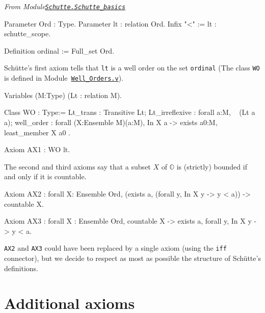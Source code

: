 \documentclass[a4paper]{book}
\begin{document}
\vspace{6pt}

\emph{From Module\href{../src/html/hydras.Schutte.Schutte_basics.html}%
{\texttt{Schutte.Schutte\_basics}}}

\begin{Coqsrc}
Parameter Ord : Type.
Parameter lt : relation Ord.
Infix "<" := lt : schutte_scope.

Definition ordinal := Full_set Ord.
\end{Coqsrc}

Schütte's first axiom tells that \texttt{lt} is a well order on the set 
\texttt{ordinal} (The  class \texttt{WO} is defined in
Module~\href{../src/html/hydras.Schutte.Well_Orders.html}%
{\texttt{Well\_Orders.v}}).

\label{types:WO}

\begin{Coqsrc}
Variables (M:Type)
         (Lt : relation M).
  
Class WO : Type:=
    {
      Lt_trans : Transitive  Lt;
      Lt_irreflexive : forall a:M, ~ (Lt a a);
      well_order : forall (X:Ensemble M)(a:M),
          In X a ->
          exists a0:M, least_member  X a0
    }.
\end{Coqsrc}



\begin{Coqsrc}
  Axiom AX1 : WO lt.
\end{Coqsrc}

The second and third axioms say that a subset $X$ of $\mathbb{O}$ is
(strictly) bounded if and only if it is countable. 



\begin{Coqsrc}
Axiom AX2 : forall X: Ensemble Ord, 
   (exists a,  (forall y, In X y -> y < a)) ->
   countable X.

Axiom AX3 : forall X : Ensemble Ord,
              countable X -> 
              exists a,  forall y, In X y -> y < a.
\end{Coqsrc}

\texttt{AX2} and \texttt{AX3} could have been replaced by a single axiom (using the \texttt{iff} connector), but we decide to respect as most as possible the structure of Schütte's definitions.

\section{Additional  axioms}
\end{document}
